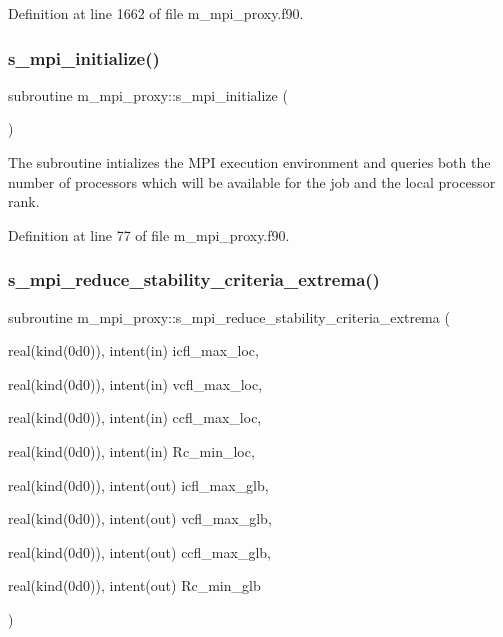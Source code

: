 Definition at line 1662 of file m\+\_\+mpi\+\_\+proxy.\+f90.

\mbox{\label{namespacem__mpi__proxy_a9bc4c617505152d3cc553e5bc25c1ee1}} 
\subsubsection{\texorpdfstring{s\+\_\+mpi\+\_\+initialize()}{s\_mpi\_initialize()}}
{\footnotesize\ttfamily subroutine m\+\_\+mpi\+\_\+proxy\+::s\+\_\+mpi\+\_\+initialize (\begin{DoxyParamCaption}{ }\end{DoxyParamCaption})}



The subroutine intializes the M\+PI execution environment and queries both the number of processors which will be available for the job and the local processor rank. 



Definition at line 77 of file m\+\_\+mpi\+\_\+proxy.\+f90.

\mbox{\label{namespacem__mpi__proxy_a340a2c9b1688582ee485dd5d9bbcc864}} 
\subsubsection{\texorpdfstring{s\+\_\+mpi\+\_\+reduce\+\_\+stability\+\_\+criteria\+\_\+extrema()}{s\_mpi\_reduce\_stability\_criteria\_extrema()}}
{\footnotesize\ttfamily subroutine m\+\_\+mpi\+\_\+proxy\+::s\+\_\+mpi\+\_\+reduce\+\_\+stability\+\_\+criteria\+\_\+extrema (\begin{DoxyParamCaption}\item[{real(kind(0d0)), intent(in)}]{icfl\+\_\+max\+\_\+loc,  }\item[{real(kind(0d0)), intent(in)}]{vcfl\+\_\+max\+\_\+loc,  }\item[{real(kind(0d0)), intent(in)}]{ccfl\+\_\+max\+\_\+loc,  }\item[{real(kind(0d0)), intent(in)}]{Rc\+\_\+min\+\_\+loc,  }\item[{real(kind(0d0)), intent(out)}]{icfl\+\_\+max\+\_\+glb,  }\item[{real(kind(0d0)), intent(out)}]{vcfl\+\_\+max\+\_\+glb,  }\item[{real(kind(0d0)), intent(out)}]{ccfl\+\_\+max\+\_\+glb,  }\item[{real(kind(0d0)), intent(out)}]{Rc\+\_\+min\+\_\+glb }\end{DoxyParamCaption})}



